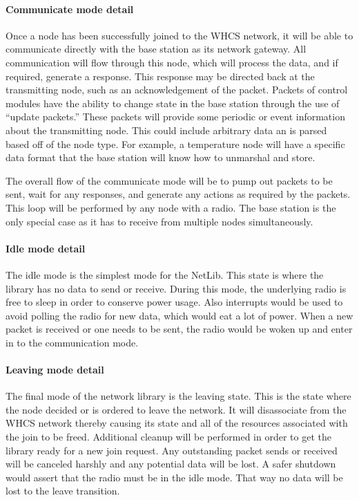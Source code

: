 
\paragraph{Communicate mode detail}
Once a node has been successfully joined to the WHCS network, it will be able
to communicate directly with the base station as its network gateway. All
communication will flow through this node, which will process the data, and if
required, generate a response. This response may be directed back at the
transmitting node, such as an acknowledgement of the packet. Packets of control
modules have the ability to change state in the base station through the use of
``update packets.'' These packets will provide some periodic or event
information about the transmitting node. This could include arbitrary data an
is parsed based off of the node type. For example, a temperature node will have
a specific data format that the base station will know how to unmarshal and
store.

The overall flow of the communicate mode will be to pump out packets to be
sent, wait for any responses, and generate any actions as required by the
packets. This loop will be performed by any node with a radio. The base station
is the only special case as it has to receive from multiple nodes
simultaneously.

\paragraph{Idle mode detail}
The idle mode is the simplest mode for the NetLib. This state is where the
library has no data to send or receive. During this mode, the underlying radio
is free to sleep in order to conserve power usage. Also interrupts would be
used to avoid polling the radio for new data, which would eat a lot of power.
When a new packet is received or one needs to be sent, the radio would be woken
up and enter in to the communication mode.

\paragraph{Leaving mode detail}
The final mode of the network library is the leaving state. This is the state
where the node decided or is ordered to leave the network. It will disassociate
from the WHCS network thereby causing its state and all of the resources
associated with the join to be freed. Additional cleanup will be performed in
order to get the library ready for a new join request. Any outstanding packet
sends or received will be canceled harshly and any potential data will be lost.
A safer shutdown would assert that the radio must be in the idle mode. That way
no data will be lost to the leave transition.  

